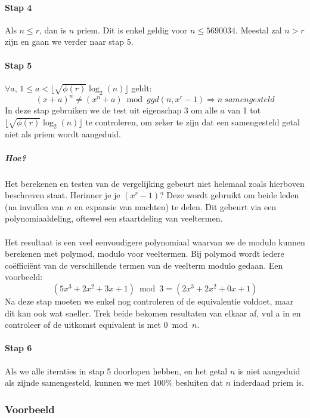 \documentclass[11pt]{article}
\begin{document}
\paragraph{Stap 4}
Als $n \le r$, dan is $n$ priem. Dit is enkel geldig voor $n \le 5690034$. Meestal zal $n > r$ zijn en gaan we verder naar stap 5.

\paragraph{Stap 5}
$\forall a$, $1 \le a < \lfloor \sqrt{\phi(r)}\log_2(n) \rfloor$ geldt:
$$(x+a)^n \ne (x^n+a) \bmod{ggd(n, x^r-1)} \Rightarrow n\ samengesteld$$
In deze stap gebruiken we de test uit eigenschap 3 om alle $a$ van 1 tot $\lfloor \sqrt{\phi(r)}\log_2(n) \rfloor$ te controleren, om zeker te zijn dat een samengesteld getal niet als priem wordt aangeduid.

\subparagraph{Hoe?}
Het berekenen en testen van de vergelijking gebeurt niet helemaal zoals hierboven beschreven staat. Herinner je je $(x^r-1)$? Deze wordt gebruikt om beide leden (na invullen van $n$ en expansie van machten) te delen. Dit gebeurt via een polynomiaaldeling, oftewel een staartdeling van veeltermen.
\\
\\
Het resultaat is een veel eenvoudigere polynomiaal waarvan we de modulo kunnen berekenen met polymod, modulo voor veeltermen. Bij polymod wordt iedere coëfficiënt van de verschillende termen van de veelterm modulo gedaan. Een voorbeeld:
$$(5x^3 + 2x ^2 + 3x +1) \bmod{3} = (2x^3+2x^2+0x+1)$$
Na deze stap moeten we enkel nog controleren of de equivalentie voldoet, maar dit kan ook wat sneller. Trek beide bekomen resultaten van elkaar af, vul a in en controleer of de uitkomst equivalent is met $ 0 \bmod{n}$.

\paragraph{Stap 6}
Als we alle iteraties in stap 5 doorlopen hebben, en het getal $n$ is niet aangeduid als zijnde samengesteld, kunnen we met 100\% besluiten dat $n$ inderdaad priem is.

\subsubsection{Voorbeeld}
\end{document}
